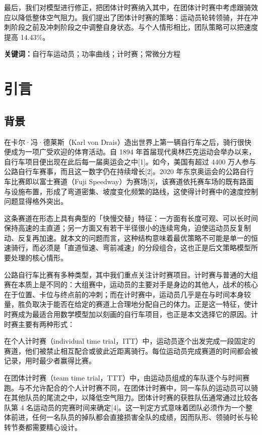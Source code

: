 \documentclass[11pt,a4paper]{ctexart}
\begin{document}
最后，我们对模型进行修正，把团体计时赛纳入其中，在团体计时赛中考虑跟骑效应以降低整体空气阻力。我们提出了团体计时赛的策略：运动员轮转领骑，并在冲刺阶段之前及冲刺阶段之中调整自身状态。与个人情形相比，团队策略可以把速度提高 14.43\%。

\vspace{6pt}
\noindent\textbf{关键词：}自行车运动员；功率曲线；计时赛；常微分方程

\newpage
\pagestyle{fancy}

\section{引言}

\subsection{背景}

在卡尔·冯·德莱斯（Karl von Drais）造出世界上第一辆自行车之后，骑行很快便成为一项广受欢迎的体育活动。自 1894 年首届现代奥林匹克运动会举办以来，自行车项目便出现在此后每一届奥运会之中[1]。如今，美国有超过 4400 万人参与公路自行车赛事，而且这一数字仍在持续增长[2]。2020 年东京奥运会的公路自行车比赛即以富士赛道（Fuji Speedway）为赛场[3]，该赛道依托赛车场的既有路面与设施布置，形成了弯道密集、坡度变化频繁的路线，这使得计时赛中的速度控制问题显得格外突出。

这条赛道在形态上具有典型的「快慢交替」特征：一方面有长度可观、可以长时间保持高速的主直道；另一方面又有若干半径很小的连续弯角，迫使运动员反复制动、反复再加速。就本文的问题而言，这种结构意味着最优策略不可能是单一的恒速骑行，而必须是「直道恒速、弯前减速」的分段组合，这也正是后文策略模型所要处理的核心情形。

公路自行车比赛有多种类型，其中我们重点关注计时赛项目。计时赛与普通的大组赛在本质上是不同的：大组赛中，运动员的主要对手是身边的其他人，战术的核心在于位置、卡位与终点前的冲刺；而在计时赛中，运动员几乎是在与时间本身较量，胜负取决于能否在给定的赛道上合理地分配自己的体力。正是这一特征，使计时赛成为最适合用数学模型加以刻画的自行车项目，也正是本文选择它的原因。计时赛主要有两种形式：

在个人计时赛（individual time trial，ITT）中，运动员逐个出发完成一段固定的赛道，他们被禁止相互配合或彼此近距离骑行。每位运动员完成赛道的时间都会被记录，用时最少者赢得比赛。

在团体计时赛（team time trial，TTT）中，由运动员组成的车队逐个与时间赛跑。与不允许配合的个人计时赛不同，在团体计时赛中，同一车队的运动员可以骑在其他队员的尾流之中，以降低空气阻力。团体计时赛的获胜队伍通常通过比较各队第 4 名运动员的完赛时间来确定[4]。这一判定方式意味着团队必须作为一个整体前进，任何一名队员的掉队都会直接损害全队的成绩，因而队形、领骑时长与轮转节奏都需要精心设计。
\end{document}
